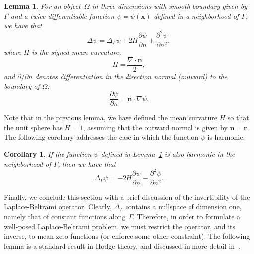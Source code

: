 \documentclass[11pt]{article}
\newcommand{\surflap}{\Delta_\Gamma}
\newcommand{\bn}{\bm n}
\newcommand{\br}{\bm r}
\newcommand{\bx}{\bm x}
\newtheorem{lemma}[theorem]{Lemma}
\newtheorem{corollary}[theorem]{Corollary}
\numberwithin{equation}{section}
\begin{document}
\begin{lemma}\label{lem_lap}
  For an object~$\Omega$ in three dimensions with smooth boundary
  given by~$\Gamma$ and a twice differentiable function
  $\psi = \psi(\bx)$ defined in a neighborhood of $\Gamma$, we have
  that
\begin{equation}\label{eq_vollap}
  \Delta \psi = \surflap \psi + 2H 
  \frac{\partial \psi}{\partial n} +
  \frac{\partial^2 \psi}{\partial n^2},
\end{equation}
where $H$ is the signed mean curvature,
\begin{equation}
H = \frac{\nabla \cdot \bn }{2},
\end{equation}
and
$\partial/\partial n$ denotes differentiation in the direction normal
(outward) to the boundary of $\Omega$:
\begin{equation}
\frac{\partial \psi}{\partial n} = \bn \cdot \nabla \psi.
\end{equation}
\end{lemma}

Note that in the previous lemma, we have defined the mean curvature
$H$ so that the unit sphere has $H = 1$, assuming that the outward
normal is given by $\bn = \br$.
The following corollary addresses the case in which
the function $\psi$ is harmonic.
\begin{corollary}
If the function $\psi$ defined in Lemma~\ref{lem_lap} is also harmonic
in the neighborhood of $\Gamma$, then we have that
\begin{equation}
\surflap \psi = -2H  \frac{\partial \psi}{\partial n} - 
  \frac{\partial^2 \psi}{\partial n^2}.
\end{equation}
\end{corollary}

Finally, we conclude this section with a brief discussion
of the invertibility of the Laplace-Beltrami operator.
Clearly, $\surflap$ contains a
 nullspace of dimension one, namely that of constant 
functions along~$\Gamma$. Therefore, in order to formulate a
well-posed Laplace-Beltrami problem, we must restrict
the operator, and its inverse, to mean-zero functions (or enforce some
other constraint).
The following lemma is a standard result in Hodge theory, and
discussed in more detail in~\cite{nedelec, EpGr}.
\end{document}
